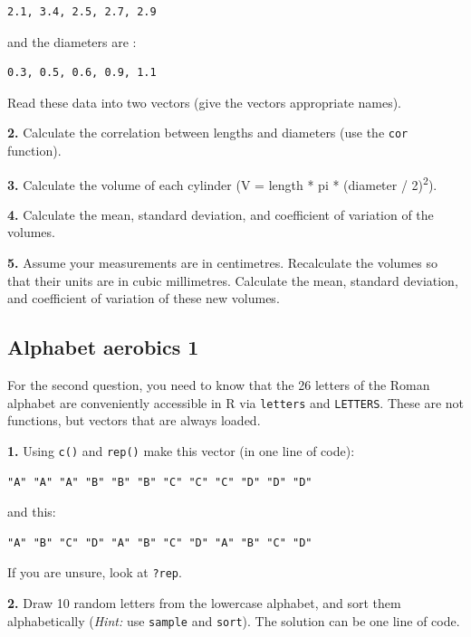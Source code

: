 \documentclass[]{book}
\begin{document}
\begin{verbatim}
2.1, 3.4, 2.5, 2.7, 2.9
\end{verbatim}

and the diameters are :

\begin{verbatim}
0.3, 0.5, 0.6, 0.9, 1.1
\end{verbatim}

Read these data into two vectors (give the vectors appropriate names).

\textbf{2.} Calculate the correlation between lengths and diameters (use the \texttt{cor} function).

\textbf{3.} Calculate the volume of each cylinder (V = length * pi * (diameter / 2)\textsuperscript{2}).

\textbf{4.} Calculate the mean, standard deviation, and coefficient of variation of the volumes.

\textbf{5.} Assume your measurements are in centimetres. Recalculate the volumes so that their units are in cubic millimetres. Calculate the mean, standard deviation, and coefficient of variation of these new volumes.

\hypertarget{alphabet-aerobics-1}{%
\subsection{Alphabet aerobics 1}\label{alphabet-aerobics-1}}

For the second question, you need to know that the 26 letters of the Roman alphabet are conveniently accessible in R via \texttt{letters} and \texttt{LETTERS}. These are not functions, but vectors that are always loaded.

\textbf{1.} Using \texttt{c()} and \texttt{rep()} make this vector (in one line of code):

\begin{verbatim}
"A" "A" "A" "B" "B" "B" "C" "C" "C" "D" "D" "D"
\end{verbatim}

and this:

\begin{verbatim}
"A" "B" "C" "D" "A" "B" "C" "D" "A" "B" "C" "D"
\end{verbatim}

If you are unsure, look at \texttt{?rep}.

\textbf{2.} Draw 10 random letters from the lowercase alphabet, and sort them alphabetically (\emph{Hint:} use \texttt{sample} and \texttt{sort}). The solution can be one line of code.
\end{document}

